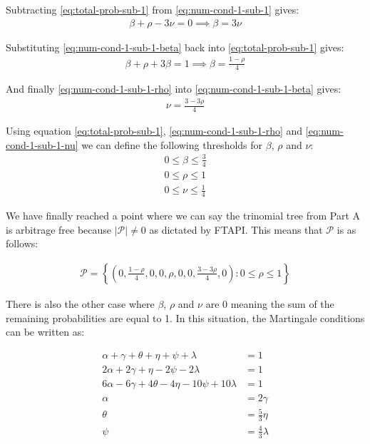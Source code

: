 \documentclass{article}
\begin{document}
Subtracting \ref{eq:total-prob-sub-1} from  \ref{eq:num-cond-1-sub-1} gives:
\begin{align}
    \beta  + \rho - 3\nu = 0 \implies \beta = 3\nu \label{eq:num-cond-1-sub-1-beta}
\end{align}

Substituting \ref{eq:num-cond-1-sub-1-beta} back into \ref{eq:total-prob-sub-1} gives:
\begin{align}
    \beta  + \rho + 3\beta = 1 \implies \beta = \frac{1-\rho}{4} \label{eq:num-cond-1-sub-1-rho}
\end{align}

And finally \ref{eq:num-cond-1-sub-1-rho} into \ref{eq:num-cond-1-sub-1-beta} gives:
\begin{align}
    \nu = \frac{3-3\rho}{4} \label{eq:num-cond-1-sub-1-nu}
\end{align}

Using equation \ref{eq:total-prob-sub-1}, \ref{eq:num-cond-1-sub-1-rho} and \ref{eq:num-cond-1-sub-1-nu} we can define the following thresholds for $\beta$, $\rho$ and $\nu$:
\begin{align*}
    0 \leq \beta \leq \frac{3}{4} \\
    0 \leq \rho \leq 1 \\
    0 \leq \nu \leq \frac{1}{4}
\end{align*}

We have finally reached a point where we can say the trinomial tree from Part A is arbitrage free because $|\mathcal{P}|\neq0$ as dictated by FTAPI. This means that $\mathcal{P}$ is as follows:

\begin{align*}
    \mathcal{P} = \left\{ \left(0, \frac{1-\rho}{4}, 0, 0 , \rho, 0, 0, \frac{3-3\rho}{4}, 0\right): 0 \leq \rho \leq 1 \right\}
\end{align*}

There is also the other case where $\beta$, $\rho$ and $\nu$ are 0 meaning the sum of the remaining probabilities are equal to 1. In this situation, the Martingale conditions can be written as: 

\begin{align}
    \alpha+\gamma+\theta+\eta+\psi+\lambda & = 1 \label{eq:EMM-cond-1} \\
    2\alpha+2\gamma + \eta - 2\psi - 2\lambda & = 1 \label{eq:EMM-cond-2}\\
    6\alpha - 6\gamma + 4\theta -4\eta -10\psi + 10\lambda & = 1 \label{eq:EMM-cond-3}\\
    \alpha & = 2\gamma \label{eq:EMM-cond-4}\\
    \theta & = \frac{5}{3}\eta \label{eq:EMM-cond-5}\\
    \psi & = \frac{4}{3}\lambda \label{eq:EMM-cond-6}
\end{align}
\end{document}
